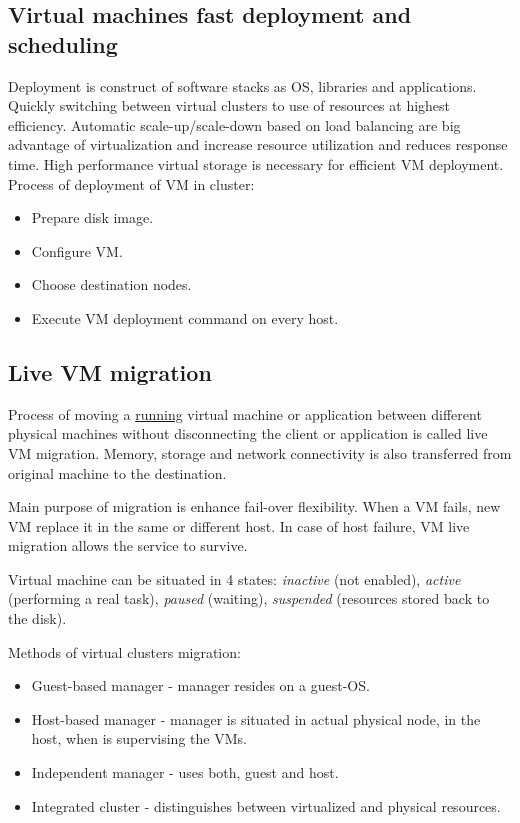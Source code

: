 \documentclass[12pt]{report}
\begin{document}
\subsection*{Virtual machines fast deployment and scheduling}
Deployment is construct of software stacks as OS, libraries and applications. Quickly switching between virtual clusters to use of resources at highest efficiency.
Automatic scale-up/scale-down based on load balancing are big advantage of virtualization and increase resource utilization and reduces response time.
High performance virtual storage is necessary for efficient VM deployment.
Process of deployment of VM in cluster:
\begin{itemize}
\item Prepare disk image.
\item Configure VM.
\item Choose destination nodes.
\item Execute VM deployment command on every host.
\end{itemize}

\subsection{Live VM migration}
Process of moving a \underline{running} virtual machine or application between different physical machines without disconnecting the client or application is called live VM migration. Memory, storage and network connectivity is also transferred from original machine to the destination.

Main purpose of migration is enhance fail-over flexibility. When a VM fails, new VM replace it in the same or different host. In case of host failure, VM live migration allows the service to survive.

Virtual machine can be situated in 4 states: \textit{inactive} (not enabled), \textit{active} (performing a real task), \textit{paused} (waiting), \textit{suspended} (resources stored back to the disk).

Methods of virtual clusters migration:
\begin{itemize}
\item Guest-based manager - manager resides on a guest-OS.
\item Host-based manager - manager is situated in actual physical node, in the host, when is supervising the VMs.
\item Independent manager - uses both, guest and host.
\item Integrated cluster - distinguishes between virtualized and physical resources.
\end{itemize}
\end{document}
